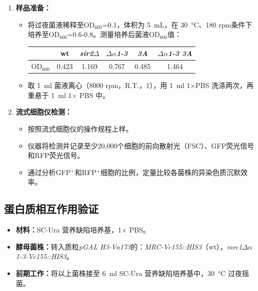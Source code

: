 \documentclass[a4,10pt]{article}
\begin{document}
\begin{enumerate}
    \item \textbf{样品准备：}
    \begin{itemize}
        \item 将过夜菌液稀释至OD$_{600}$=0.1，体积为 \qty{5}{\mL}，在 \qty{30}{\celsius}、180 rpm条件下培养至OD$_{600}$=0.6-0.8。测量培养后菌液OD$_{600}$值：
        \begin{table}[htbp]
            \centering
            \normalsize 
            \begin{tabular}{|c|c|c|c|c|c|}
                \hline
                 & \textbf{wt} & \textbf{\textit{sir2}$\Delta$} & \textbf{$\Delta \alpha$\textit{1-3}} & \textbf{\textit{3A}} & \textbf{$\Delta\alpha$\textit{1-3 3A}} \\
                \hline
                OD$_{600}$ & 0.423 & 1.169 & 0.767 & 0.485 & 1.464 \\
                \hline
            \end{tabular}
        \end{table}
        
        \item 取 \qty{1}{\ml} 菌液离心（8000 rpm，R.T.，\qty{1}{\min}），用 \qty{1}{\ml} 1$\times$PBS 洗涤两次，再重悬于 \qty{1}{\ml} 1$\times$ PBS 中。
    \end{itemize}
        
    \item \textbf{流式细胞仪检测：}
    \begin{itemize}
        \item 按照流式细胞仪的操作规程上样。
        \item 仪器将检测并记录至少20,000个细胞的前向散射光（FSC）、GFP荧光信号和RFP荧光信号。
        \item 通过分析GFP$^+$和RFP$^+$细胞的比例，定量比较各菌株的异染色质沉默效率。
    \end{itemize}
\end{enumerate}

\subsection{蛋白质相互作用验证}

\begin{itemize}
    \item \textbf{材料：}SC-Ura 营养缺陷培养基，1$\times$ PBS。
    \item \textbf{酵母菌株：}转入质粒\textit{pGAL H3-Vn173}的：\textit{MRC-Vc155::HIS3}（wt），\textit{mrc1}$\Delta \alpha$\textit{1-3-Vc155::HIS3}。
    \item \textbf{前期工作：}将以上菌株接至 \qty{6}{\ml} SC-Ura 营养缺陷培养基中，\qty{30}{\celsius} 过夜摇菌。
\end{itemize}
\end{document}
